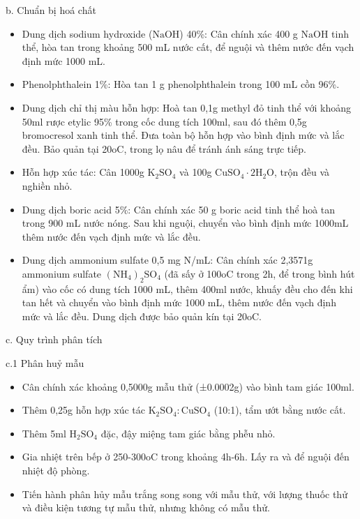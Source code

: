 b. Chuẩn bị hoá chất
\begin{itemize}
  \item Dung dịch sodium hydroxide (\(\mathrm{NaOH}\)) 40\%: Cân chính xác 400 g \(\mathrm{NaOH}\) tinh thể, hòa tan trong khoảng 500 mL nước cất, để nguội và thêm nước đến vạch định mức 1000 mL.
  \item Phenolphthalein 1\%: Hòa tan 1 g phenolphthalein trong 100 mL cồn 96\%.
  \item Dung dịch chỉ thị màu hỗn hợp: Hoà tan 0,1g methyl đỏ tinh thể với khoảng 50ml rược etylic 95\% trong cốc dung tích 100ml, sau đó thêm 0,5g bromocresol xanh tinh thể.
  Đưa toàn bộ hỗn hợp vào bình định mức và lắc đều. Bảo quản tại 20oC, trong lọ nâu để tránh ánh sáng trực tiếp.
  \item Hỗn hợp xúc tác: Cân 1000g \(\mathrm{K_2SO_4}\) và 100g \(\mathrm{CuSO_4\cdot 2H_2O}\), trộn đều và nghiền nhỏ.
  \item Dung dịch boric acid 5\%: Cân chính xác 50 g boric acid tinh thể hoà tan trong 900 mL nước nóng. Sau khi nguội, chuyển vào bình định mức 1000mL thêm nước đến vạch định mức và lắc đều.
  \item Dung dịch ammonium sulfate 0,5 mg N/mL: Cân chính xác 2,3571g ammonium sulfate \(\mathrm{(NH_4)_2SO_4}\) (đã sấy ở 100oC trong 2h, để trong bình hút ẩm) vào cốc có dung tích 1000 mL, thêm 400ml nước, khuấy đều cho đến khi tan hết và chuyển vào bình định mức 1000 mL, thêm nước đến vạch định mức và lắc đều.
  Dung dịch được bảo quản kín tại 20oC.
\end{itemize}

c. Quy trình phân tích

c.1 Phân huỷ mẫu

\begin{itemize}
  \item Cân chính xác khoảng 0,5000g mẫu thử (±0.0002g) vào bình tam giác 100ml.
  \item Thêm 0,25g hỗn hợp xúc tác \(\mathrm{K_2SO_4:CuSO_4}\) (10:1), tẩm ướt bằng nước cất.
  \item Thêm 5ml \(\mathrm{H_2SO_4}\) đặc, đậy miệng tam giác bằng phễu nhỏ.
  \item Gia nhiệt trên bếp ở 250-300oC trong khoảng 4h-6h. Lấy ra và để nguội đến nhiệt độ phòng.
  \item Tiến hành phân hủy mẫu trắng song song với mẫu thử, với lượng thuốc thử và điều kiện tương tự mẫu thử, nhưng không có mẫu thử.
\end{itemize}

